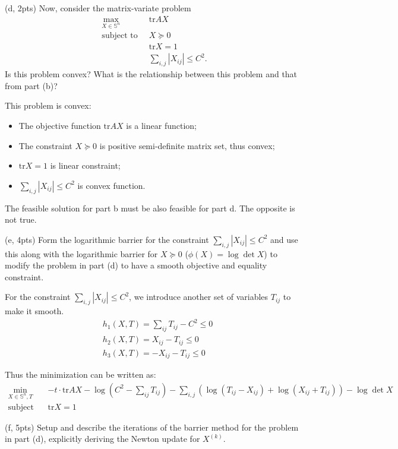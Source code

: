 \documentclass{article}
\theoremstyle{remark}
\theoremstyle{definition}
\newcommand{\st}{\mathop{\mathrm{subject\,\,to}}}
\def\tr{\mathrm{tr}}
\begin{document}
\bigskip
\noindent
(d, 2pts) Now, consider the matrix-variate problem
\[
\begin{split}
\max_{X \in \mathbb{S}^n} \;\; & \tr AX \\
\st \;\; & X \succeq 0 \\
\;\; & \tr X = 1 \\
& \sum_{i,j} |X_{ij}| \le C^2.
\end{split}
\]
Is this problem convex?  What is the relationship between this problem and that
from part (b)?  

{
\color{blue}
This problem is convex:
\begin{itemize}
    \item The objective function $\tr AX$ is a linear function;
    \item The constraint $X\succeq 0$ is positive semi-definite matrix set, thus convex;
    \item $\tr X=1$ is linear constraint;
    \item $\sum_{i,j} |X_{ij}| \le C^2$ is convex function.
\end{itemize}

The feasible solution for part b must be also feasible for part d. The opposite is not true.
}

\bigskip
\noindent
(e, 4pts) Form the logarithmic barrier for the constraint $\sum_{i,j}|X_{ij}| \le C^2$
and use this along with the logarithmic barrier for $X \succeq 0$ ($\phi(X) =
\log \det X$) to modify the problem in part (d) to have a smooth objective and
equality constraint.

{
\color{blue}
For the constraint $\sum_{i,j}|X_{ij}| \le C^2$, we introduce another set of variables $T_{ij}$ to make it smooth.
\begin{align*}
    &h_1(X,T)=\sum_{ij}T_{ij} - C^2 \leq 0 \\
    &h_2(X,T)=X_{ij}-T_{ij} \leq 0 \\
    &h_3(X,T)=-X_{ij}-T_{ij} \leq 0
\end{align*}

Thus the minimization can be written as:
\[
\begin{split}
\min_{X \in \mathbb{S}^n, T} \;\; & -t\cdot \tr AX -\log (C^2-\sum_{ij}T_{ij}) -\sum_{i,j}(\log (T_{ij}-X_{ij})+\log (X_{ij}+T_{ij}))- \log \det X\\
\st \;\; & \tr X = 1
\end{split}
\]
}

\bigskip
\noindent
(f, 5pts) Setup and describe the iterations of the barrier method for the problem in
part (d), explicitly deriving the Newton update for $X^{(k)}$.
\end{document}
